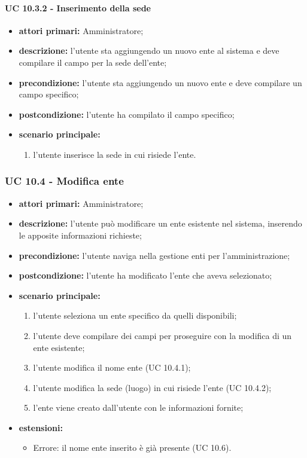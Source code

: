 				\paragraph{UC 10.3.2 - Inserimento della sede}
				\begin{itemize}
					\item \textbf{attori primari:} Amministratore;
					\item \textbf{descrizione:} l'utente sta aggiungendo un nuovo ente al sistema e deve compilare il campo per la sede dell'ente;
					\item \textbf{precondizione:} l'utente sta aggiungendo un nuovo ente e deve compilare un campo specifico;
					\item \textbf{postcondizione:} l'utente ha compilato il campo specifico;
					\item \textbf{scenario principale:}
					\begin{enumerate}
						\item l'utente inserisce la sede in cui risiede l'ente.
					\end{enumerate}	
				\end{itemize}			

			\subsubsection{UC 10.4 - Modifica ente}
			\begin{itemize}
				\item \textbf{attori primari:} Amministratore;
				\item \textbf{descrizione:} l'utente può modificare un ente esistente nel sistema, inserendo le apposite informazioni richieste;
				\item \textbf{precondizione:} l'utente naviga nella gestione enti per l'amministrazione;
				\item \textbf{postcondizione:} l'utente ha modificato l'ente che aveva selezionato;
				\item \textbf{scenario principale:}
				\begin{enumerate}
					\item l'utente seleziona un ente specifico da quelli disponibili;
					\item{l'utente deve compilare dei campi per proseguire con la modifica di un ente esistente;}
					\item l'utente modifica il nome ente (UC 10.4.1);
					\item l'utente modifica la sede (luogo) in cui risiede l'ente (UC 10.4.2);
					\item{l'ente viene creato dall'utente con le informazioni fornite;}
				\end{enumerate}	
				\item \textbf{estensioni:}
					\begin{itemize}
						\item Errore: il nome ente inserito è già presente (UC 10.6).
					\end{itemize}
			\end{itemize}	

